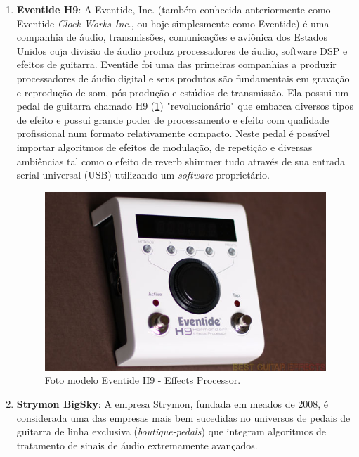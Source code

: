 			
			\begin{enumerate}
				\item \textbf{Eventide H9}: A Eventide, Inc. (também conhecida anteriormente como Eventide \textit{Clock Works Inc}., ou hoje simplesmente como Eventide) é uma companhia de áudio, transmissões, comunicações e aviônica dos Estados Unidos cuja divisão de áudio produz processadores de áudio, software DSP e efeitos de guitarra.
				Eventide foi uma das primeiras companhias a produzir processadores de áudio digital e seus produtos são fundamentais em gravação e reprodução de som, pós-produção e estúdios de transmissão. Ela possui um pedal de guitarra chamado H9 (\ref{eventide-h9}) "revolucionário" que embarca diversos tipos de efeito e possui grande poder de processamento e efeito com qualidade profissional num formato relativamente compacto. Neste pedal é possível importar algoritmos de efeitos de modulação, de repetição e diversas ambiências tal como o efeito de reverb shimmer tudo através de sua entrada serial universal (USB) utilizando um \textit{software} proprietário.
				
				\begin{figure}[!h]
					\centering
					\includegraphics[scale=0.3]{./figuras/eventide-h9.jpg}
					\caption{Foto modelo Eventide H9 - Effects Processor.}
					\label{eventide-h9}
				\end{figure}
				
				\item \textbf{Strymon BigSky}: A empresa Strymon, fundada em meados de 2008, é considerada uma das empresas mais bem sucedidas no universos de pedais de guitarra de linha exclusiva (\textit{boutique-pedals}) que integram algoritmos de tratamento de sinais de áudio extremamente avançados.
				

\end{enumerate}
